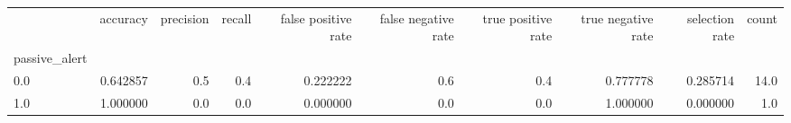 \begin{tabular}{lrrrrrrrrr}
\toprule
{} &  accuracy &  precision &  recall &  false positive rate &  false negative rate &  true positive rate &  true negative rate &  selection rate &  count \\
passive\_alert &           &            &         &                      &                      &                     &                     &                 &        \\
\midrule
0.0           &  0.642857 &        0.5 &     0.4 &             0.222222 &                  0.6 &                 0.4 &            0.777778 &        0.285714 &   14.0 \\
1.0           &  1.000000 &        0.0 &     0.0 &             0.000000 &                  0.0 &                 0.0 &            1.000000 &        0.000000 &    1.0 \\
\bottomrule
\end{tabular}
